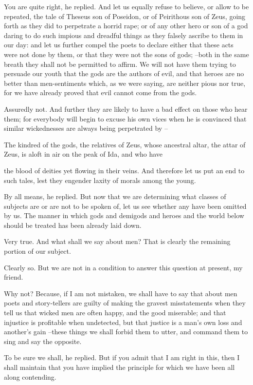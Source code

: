 You are quite right, he replied.
And let us equally refuse to believe, or allow to be repeated, the tale of Theseus son of Poseidon, or of Peirithous son of Zeus, going forth as they did to perpetrate a horrid rape; or of any other hero or son of a god daring to do such impious and dreadful things as they falsely ascribe to them in our day: and let us further compel the poets to declare either that these acts were not done by them, or that they were not the sons of gods; --both in the same breath they shall not be permitted to affirm. We will not have them trying to persuade our youth that the gods are the authors of evil, and that heroes are no better than men-sentiments which, as we were saying, are neither pious nor true, for we have already proved that evil cannot come from the gods.

Assuredly not.
And further they are likely to have a bad effect on those who hear them; for everybody will begin to excuse his own vices when he is convinced that similar wickednesses are always being perpetrated by --

The kindred of the gods, the relatives of Zeus, whose ancestral altar, the attar of Zeus, is aloft in air on the peak of Ida, and who have

the blood of deities yet flowing in their veins. And therefore let us put an end to such tales, lest they engender laxity of morals among the young.

By all means, he replied.
But now that we are determining what classes of subjects are or are not to be spoken of, let us see whether any have been omitted by us. The manner in which gods and demigods and heroes and the world below should be treated has been already laid down.

Very true.
And what shall we say about men? That is clearly the remaining portion of our subject.

Clearly so.
But we are not in a condition to answer this question at present, my friend.

Why not?
Because, if I am not mistaken, we shall have to say that about men poets and story-tellers are guilty of making the gravest misstatements when they tell us that wicked men are often happy, and the good miserable; and that injustice is profitable when undetected, but that justice is a man's own loss and another's gain --these things we shall forbid them to utter, and command them to sing and say the opposite.

To be sure we shall, he replied.
But if you admit that I am right in this, then I shall maintain that you have implied the principle for which we have been all along contending.

